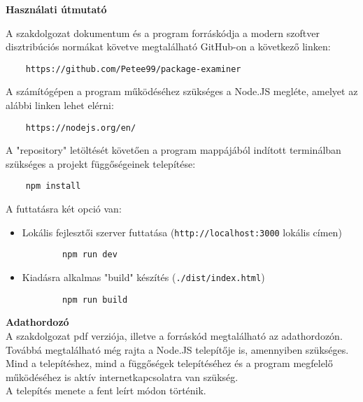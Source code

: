 \pagestyle{empty}

\noindent \textbf{\Large Használati útmutató}

\vskip 1cm

A szakdolgozat dokumentum és a program forráskódja a modern szoftver disztribúciós normákat követve megtalálható GitHub-on a következő linken:

\begin{verbatim}
	https://github.com/Petee99/package-examiner
\end{verbatim}

A számítógépen a program működéséhez szükséges a Node.JS megléte, amelyet az alábbi linken lehet elérni:

\begin{verbatim}
	https://nodejs.org/en/
\end{verbatim}

A "repository" letöltését követően a program mappájából indított terminálban szükséges a projekt függőségeinek telepítése:

\begin{verbatim}
	npm install
\end{verbatim}

A futtatásra két opció van:

\begin{itemize}
	\item Lokális fejlesztői szerver futtatása (\texttt{http://localhost:3000} lokális címen)
	\begin{verbatim}
		npm run dev
	\end{verbatim}
	\item Kiadásra alkalmas "build" készítés (\texttt{./dist/index.html})
	\begin{verbatim}
		npm run build
	\end{verbatim}
\end{itemize}

\noindent \textbf{Adathordozó}\\

A szakdolgozat pdf verziója, illetve a forráskód megtalálható az adathordozón. Továbbá megtalálható még rajta a Node.JS telepítője is, amennyiben szükséges.\\

Mind a telepítéshez, mind a függőségek telepítéséhez és a program megfelelő működéséhez is aktív internetkapcsolatra van szükség.\\

A telepítés menete a fent leírt módon történik.


